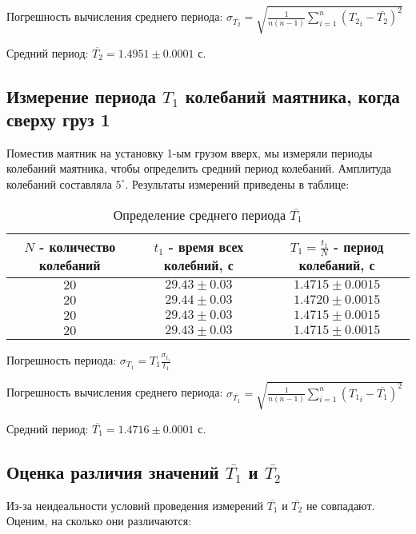 \documentclass[a4paper]{article}
\begin{document}
\item Погрешность вычисления среднего периода: $\sigma_{\overline{T_2}} = \sqrt{\frac{1}{n(n-1)}\sum_{i=1}^{n} ({T_2}_i - \overline{T_2})^2}$

\item Средний период: $\overline{T_2} = 1.4951\pm{0.0001}$ с.

\subsection{Измерение периода $T_1$ колебаний маятника, когда сверху груз 1}

Поместив маятник на установку 1-ым грузом вверх, мы измеряли периоды колебаний маятника, чтобы определить средний период колебаний. Амплитуда колебаний составляла $5^{\circ}$. Результаты измерений приведены в таблице:

\begin{table}[h!]
\centering
\caption{Определение среднего периода $\overline{T_1}$}
\begin{tabular}{|c|c|c|}
\hline
$N$ - количество колебаний & $t_1$ - время всех колебний, с & $T_1 = \frac{t_1}{N}$ - период колебаний, с  \\ \hline
$20$  & $29.43\pm{0.03}$ & $1.4715\pm{0.0015}$   \\ \hline
$20$  & $29.44\pm{0.03}$ & $1.4720\pm{0.0015}$   \\ \hline
$20$  & $29.43\pm{0.03}$ & $1.4715\pm{0.0015}$   \\ \hline
$20$  & $29.43\pm{0.03}$ & $1.4715\pm{0.0015}$   \\ \hline
\end{tabular}
\end{table}

\item Погрешность периода: $\sigma_{T_1} = T_1\frac{\sigma_{t_1}}{t_1}$

\item Погрешность вычисления среднего периода: $\sigma_{\overline{T_1}} = \sqrt{\frac{1}{n(n-1)}\sum_{i=1}^{n} ({T_1}_i - \overline{T_1})^2}$

\item Средний период: $\overline{T_1} = 1.4716\pm{0.0001}$ с.

\subsection{Оценка различия значений $\overline{T_1}$ и $\overline{T_2}$}

Из-за неидеальности условий проведения измерений $\overline{T_1}$ и $\overline{T_2}$ не совпадают. Оценим, на сколько они различаются:
\end{document}

